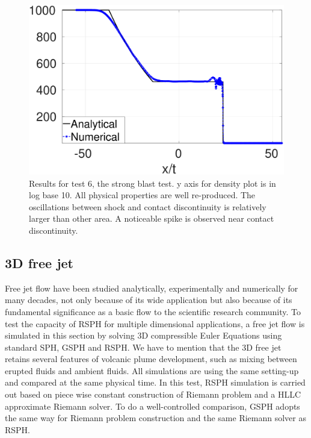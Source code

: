 \begin{figure}
\begin{minipage}{.495 \textwidth}
    \end{minipage}%
    \begin{minipage}{.495 \textwidth}
        \centering
        \includegraphics[width=0.99 \textwidth]{Chapter-4/Figures/strong-blast/StrBlst-RCM-p-Rp3}
    \end{minipage}%
    \caption{Results for test 6, the strong blast test. y axis for density plot is in log base 10. All physical properties are well re-produced. The oscillations between shock and contact discontinuity is relatively larger than other area. A noticeable spike is observed near contact discontinuity.}
    \label{fig:RCM-strong-blast}
\end{figure}

\subsection{3D free jet}
Free jet flow have been studied analytically, experimentally and numerically for many decades, not only because of its wide application but also because of its fundamental significance as a basic flow to the scientific research community. To test the capacity of RSPH for multiple dimensional applications, a free jet flow is simulated in this section by solving 3D compressible Euler Equations using standard SPH, GSPH and RSPH. We have to mention that the 3D free jet retains several features of volcanic plume development, such as mixing between erupted fluids and ambient fluids.
All simulations are using the same setting-up and compared at the same physical time. In this test, RSPH simulation is carried out based on piece wise constant construction of Riemann problem and a HLLC approximate Riemann solver. To do a well-controlled comparison, GSPH adopts the same way for Riemann problem construction and the same Riemann solver as RSPH. 

